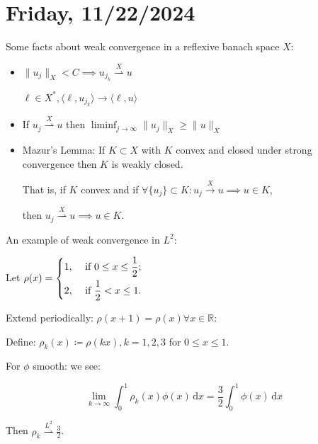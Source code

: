 \documentclass{article}
\theoremstyle{definition}
\begin{document}
\section*{Friday, 11/22/2024}

Some facts about weak convergence in a reflexive banach space \(X\):

\begin{itemize}
    \item \(\lVert u_j \rVert _X < C \implies u_{j_k} \overset{X}{\rightharpoonup} u\) 

    \(\ell \in X^{\ast}, \langle \ell , u_{j_k}  \rangle \to \langle \ell , u \rangle\) 

    \item If \(u_j \overset{X}{\rightharpoonup} u\) then \(\liminf_{j \to \infty} \lVert u_j \rVert _X \geq \lVert u \rVert _X\) 
    
    \item Mazur's Lemma: If \(K \subset X\) with \(K\) convex and closed under strong convergence then \(K\) is weakly closed.
    
    That is, if \(K\) convex and if \(\forall \{ u_j \} \subset K:u_j \overset{X}{\to} u \implies u\in K\),
    
    then \(u_j \overset{X}{\rightharpoonup} u \implies u\in K\).

\end{itemize}

An example of weak convergence in \(L^2:\) 

Let \(\rho (x) = \begin{dcases}
    1, &\text{ if } 0 \leq x \leq \frac{1}{2} ;\\
    2, &\text{ if } \frac{1}{2} < x \leq 1.
\end{dcases}\) 


Extend periodically: \(\rho(x+1) = \rho(x) \forall x \in \mathbb{R}\):

Define: \(\rho_k(x) \coloneqq \rho(kx), k = 1,2,3\) for \(0 \leq x \leq 1\).

For \(\phi\) smooth: we see:

\[
    \lim_{k \to \infty} \int_{0}^{1} \rho_k (x) \phi(x) \,\mathrm{d}x = \frac{3}{2} \int_{0}^{1} \phi(x) \,\mathrm{d}x 
\]

Then \(\rho_k \overset{L^2}{\rightharpoonup} \frac{3}{2}\).
\end{document}

